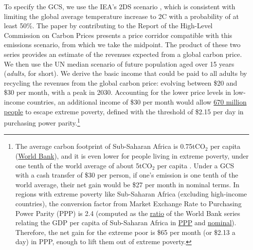 To specify the GCS, we use the IEA's 2DS scenario , which is consistent with limiting the global average temperature increase to 2\textdegree{}C with a probability of at least 50\%. The paper by  contributing to the Report of the High-Level Commission on Carbon Prices  presents a price corridor compatible with this emissions scenario, from which we take the midpoint. The product of these two series provides an estimate of the revenues expected from a global carbon price. We then use the UN median scenario of future population aged over 15 years (\textit{adults}, for short). We derive the basic income that could be paid to all adults by recycling the revenues from the global carbon price: evolving between \$20 and \$30 per month, with a peak in 2030. Accounting for the lower price levels in low-income countries, an additional income of \$30 per month would allow \href{https://data.worldbank.org/indicator/SI.POV.DDAY}{670 million people} to escape extreme poverty, defined with the threshold of \$2.15 per day in purchasing power parity.\footnote{The average carbon footprint of Sub-Saharan Africa is 0.75tCO$_{\text{2}}$ per capita (\href{https://www.macrotrends.net/countries/SSF/sub-saharan-africa-/carbon-co2-emissions}{World Bank}), and it is even lower for people living in extreme poverty, under one tenth of the world average of about 5tCO$_{\text{2}}$ per capita . Under a GCS with a cash transfer of \$30 per person, if one's emission is one tenth of the world average, their net gain would be \$27 per month in nominal terms. In regions with extreme poverty like Sub-Saharan Africa (excluding high-income countries), the conversion factor from Market Exchange Rate to Purchasing Power Parity (PPP) is 2.4 (computed as the \href{https://data.worldbank.org/indicator/PA.NUS.PPPC.RF}{ratio} of the World Bank series relating the GDP per capita of Sub-Saharan Africa in \href{https://data.worldbank.org/indicator/NY.GDP.PCAP.PP.KD?locations=ZG&year_high_desc=true}{PPP} and \href{https://data.worldbank.org/indicator/NY.GDP.PCAP.KD?locations=ZG&year_high_desc=true}{nominal}). Therefore, the net gain for the extreme poor is \$65 per month (or \$2.13 a day) in PPP, enough to lift them out of extreme poverty.%
} 

